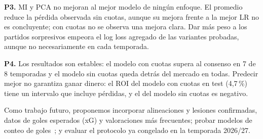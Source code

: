 \documentclass[conference]{IEEEtran}
\begin{document}
\textbf{P3.} MI y PCA no mejoran al mejor modelo de ningún enfoque. El promedio reduce la pérdida observada sin cuotas, aunque su mejora frente a la mejor LR no es concluyente; con cuotas no se observa una mejora clara. Dar más peso a los partidos sorpresivos empeora el log loss agregado de las variantes probadas, aunque no necesariamente en cada temporada.

\textbf{P4.} Los resultados son estables: el modelo con cuotas supera al consenso en 7 de 8 temporadas y el modelo sin cuotas queda detrás del mercado en todas. Predecir mejor no garantiza ganar dinero: el ROI del modelo con cuotas en test (4{,}7\,\%) tiene un intervalo que incluye pérdidas, y el del modelo sin cuotas es negativo.

Como trabajo futuro, proponemos incorporar alineaciones y lesiones confirmadas, datos de goles esperados (xG) y valoraciones más frecuentes; probar modelos de conteo de goles~\cite{dixon1997,karlis2003}; y evaluar el protocolo ya congelado en la temporada 2026/27.
\end{document}
